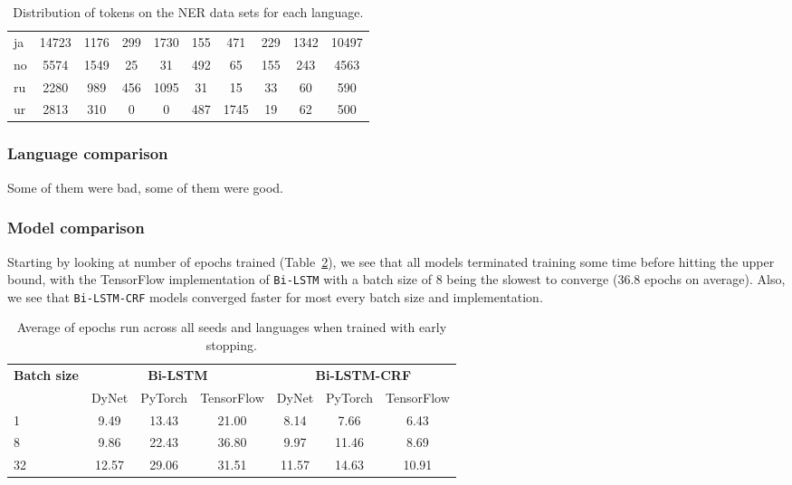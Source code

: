 \begin{table}[h!]
\begin{tabular}{l c c c c c c c c c}
        ja  &14723 & 1176 &
        299 & 1730 &  155 &  471 &  229 & 1342 &10497 \\

        no  & 5574 & 1549 &
         25 &   31 &  492 &   65 &  155 &  243 & 4563 \\

        ru  & 2280 &  989 &
        456 & 1095 &   31 &   15 &   33 &   60 &  590 \\

        ur  & 2813 &  310 &
          0 &    0 &  487 & 1745 &   19 &   62 &  500 \\
        \bottomrule
    \end{tabular}
    \caption{Distribution of tokens on the NER data sets for each language.
    }\label{table:token-distribution-ner}
\end{table}


\subsubsection{Language comparison}

Some of them were bad, some of them were good.


\subsubsection{Model comparison}

Starting by looking at number of epochs trained
(Table~\ref{table:epochs-run-ner}), we see that all models terminated training
some time before hitting the upper bound, with the TensorFlow implementation of
\texttt{Bi-LSTM} with a batch size of 8 being the slowest to converge (36.8
epochs on average). Also, we see that \texttt{Bi-LSTM-CRF} models converged
faster for most every batch size and implementation.

\begin{table}[h!]
    \centering
    \begin{tabular}{l c c c|c c c}
        \toprule
        \multirow{2}{*}{\bfseries Batch size}     &
        \multicolumn{3}{c}{\bfseries Bi-LSTM}     &
        \multicolumn{3}{c}{\bfseries Bi-LSTM-CRF} \\
        \cmidrule(lr){2-7}
        & DyNet & PyTorch & TensorFlow
        & DyNet & PyTorch & TensorFlow \\
        \cmidrule(lr){1-7}
         1 &  9.49 & 13.43 & 21.00 &  8.14 &  7.66 &  6.43 \\
         8 &  9.86 & 22.43 & 36.80 &  9.97 & 11.46 &  8.69 \\
        32 & 12.57 & 29.06 & 31.51 & 11.57 & 14.63 & 10.91 \\
        \bottomrule
    \end{tabular}
    \caption{Average of epochs run across all seeds and languages when trained
        with early stopping.
        }\label{table:epochs-run-ner}
\end{table}

